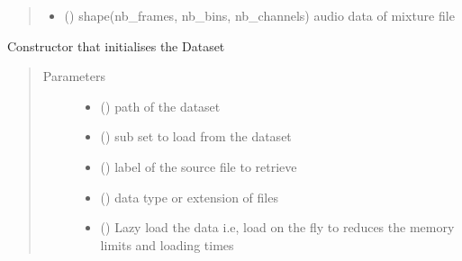 \documentclass[letterpaper,10pt,english]{sphinxmanual}
\begin{document}
\begin{fulllineitems}
\begin{fulllineitems}
\begin{quote}
\begin{description}
\begin{itemize}
\item {} 
 () \textendash{} shape(nb\_frames, nb\_bins, nb\_channels)
audio data of mixture file

\end{itemize}


\end{description}\end{quote}

\end{fulllineitems}


\begin{fulllineitems}
\label{\detokenize{docs/source/dataset:dataset.Dataset.__init__}}
Constructor that initialises the Dataset
\begin{quote}\begin{description}
\item[{Parameters}] \leavevmode\begin{itemize}
\item {} 
 () \textendash{} path of the dataset

\item {} 
 () \textendash{} sub set to load from the dataset

\item {} 
 () \textendash{} label of the source file to retrieve

\item {} 
 () \textendash{} data type or extension of files

\item {} 
 () \textendash{} Lazy load the data i.e, load on the fly to reduces the memory limits and loading times


\end{itemize}
\end{description}
\end{quote}
\end{fulllineitems}
\end{fulllineitems}
\end{document}
